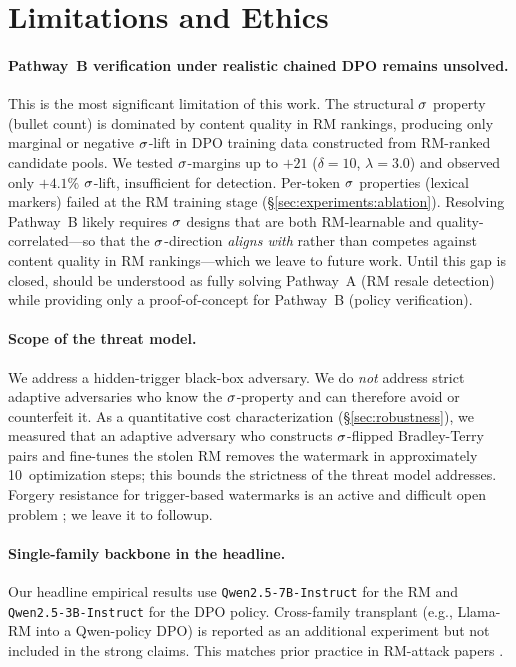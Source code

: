 \section{Limitations and Ethics}
\label{sec:limitations}

\paragraph{Pathway~B verification under realistic chained DPO
remains unsolved.}
This is the most significant limitation of this work.
The structural $\sigma$ property (bullet count) is dominated
by content quality in RM rankings, producing only marginal or
negative $\sigma$-lift in DPO training data constructed from
RM-ranked candidate pools. We tested $\sigma$-margins up to
$+21$ ($\delta{=}10$, $\lambda{=}3.0$) and observed only $+4.1\%$
$\sigma$-lift, insufficient for \verifyc{} detection.
Per-token $\sigma$ properties (lexical markers) failed at the
RM training stage (\S\ref{sec:experiments:ablation}).
Resolving Pathway~B likely requires $\sigma$ designs that are
both RM-learnable and quality-correlated---so that the
$\sigma$-direction \emph{aligns with} rather than competes
against content quality in RM rankings---which we leave to future
work. Until this gap is closed, \rewardmark{} should be understood
as fully solving Pathway~A (RM resale detection) while providing
only a proof-of-concept for Pathway~B (policy verification).

\paragraph{Scope of the threat model.} We address a hidden-trigger
black-box adversary. We do \emph{not} address strict adaptive
adversaries who know the $\sigma$-property and can therefore
avoid or counterfeit it. As a quantitative cost characterization
(\S\ref{sec:robustness}), we measured that an adaptive adversary
who constructs $\sigma$-flipped Bradley-Terry pairs and
fine-tunes the stolen RM removes the watermark in approximately
10~optimization steps; this bounds the strictness of the threat
model \rewardmark{} addresses. Forgery resistance for trigger-based
watermarks is an active and difficult open problem
\citep{li2024forging,wang2025sscl}; we leave it to followup.

\paragraph{Single-family backbone in the headline.} Our
headline empirical results use \texttt{Qwen2.5-7B-Instruct} for the
RM and \texttt{Qwen2.5-3B-Instruct} for the DPO policy. Cross-family transplant (e.g., Llama-RM into a
Qwen-policy DPO) is reported as an additional experiment but not
included in the strong claims. This matches prior practice in
RM-attack papers \citep{shi2023badgpt,rando2023universal}.

